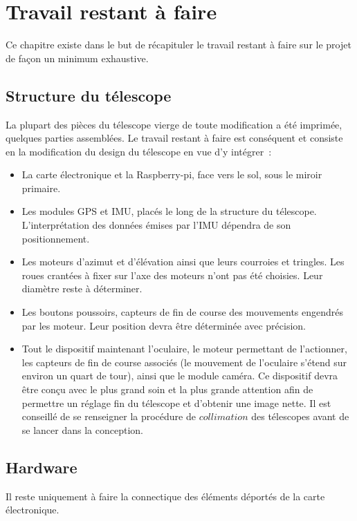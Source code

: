 \chapter{Travail restant à faire}

Ce chapitre existe dans le but de récapituler le travail restant à faire sur le projet de façon un minimum exhaustive.

\section{Structure du télescope}

La plupart des pièces du télescope vierge de toute modification a été imprimée, quelques parties assemblées. Le travail restant à faire est conséquent et consiste en la modification du design du télescope en vue d'y intégrer~:
\begin{itemize}[label=$\bullet$]
	\item La carte électronique et la Raspberry-pi, face vers le sol, sous le miroir primaire.
	\item Les modules GPS et IMU, placés le long de la structure du télescope. L'interprétation des données émises par l'IMU dépendra de son positionnement.
	\item Les moteurs d'azimut et d'élévation ainsi que leurs courroies et tringles. Les roues crantées à fixer sur l'axe des moteurs n'ont pas été choisies. Leur diamètre reste à déterminer.
	\item Les boutons poussoirs, capteurs de fin de course des mouvements engendrés par les moteur. Leur position devra être déterminée avec précision.
	\item Tout le dispositif maintenant l'oculaire, le moteur permettant de l'actionner, les capteurs de fin de course associés (le mouvement de l'oculaire s'étend sur environ un quart de tour), ainsi que le module caméra. Ce dispositif devra être conçu avec le plus grand soin et la plus grande attention afin de permettre un réglage fin du télescope et d'obtenir une image nette. Il est conseillé de se renseigner la procédure de $collimation$ des télescopes avant de se lancer dans la conception.
	\end{itemize}

\section{Hardware}

Il reste uniquement à faire la connectique des éléments déportés de la carte électronique.

